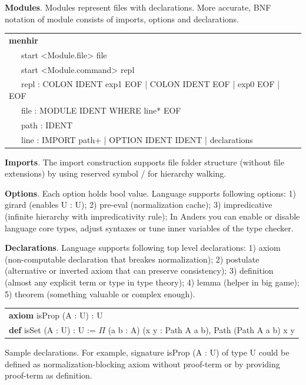 \documentclass[a4paper,UKenglish,cleveref, autoref, thm-restate]{lipics-v2021}
\newcommand{\tabstyle}[0]{\scriptsize\ttfamily\fontseries{l}\selectfont}
\begin{document}
\textbf{Modules}. Modules represent files with declarations. More accurate, BNF notation of module consists of imports, options and declarations.
\begin{table}[ht!]
\tabstyle
\begin{tabular}{l}
\textbf{menhir} \\
\ \ \ start <Module.file> file \\
\ \ \ start <Module.command> repl \\
\ \ \ repl : COLON IDENT exp1 EOF | COLON IDENT EOF | exp0 EOF | EOF \\
\ \ \ file : MODULE IDENT WHERE line* EOF \\
\ \ \ path : IDENT \\
\ \ \ line : IMPORT path+ | OPTION IDENT IDENT | declarations \\
\end{tabular}
\end{table}

\textbf{Imports}. The import construction supports file folder structure (without file extensions)
by using reserved symbol / for hierarchy walking.

\textbf{Options}. Each option holds bool value. Language supports following options:
1) girard (enables U : U);
2) pre-eval (normalization cache);
3) impredicative (infinite hierarchy with impredicativity rule);
In Anders you can enable or disable language core types, adjust syntaxes or
tune inner variables of the type checker.

\textbf{Declarations}. Language supports following top level declarations:
1) axiom (non-computable declaration that breakes normalization);
2) postulate (alternative or inverted axiom that can preserve consistency);
3) definition (almost any explicit term or type in type theory);
4) lemma (helper in big game);
5) theorem (something valuable or complex enough).

\begin{table}[ht!]
\tabstyle
\begin{tabular}{l}
\textbf{axiom} isProp (A : U) : U \\
\textbf{def} isSet (A : U) : U := \textbf{$\Pi$} (a b : A) (x y : Path A a b), Path (Path A a b) x y
\end{tabular}
\end{table}

Sample declarations. For example, signature isProp (A : U) of type U could be
defined as normalization-blocking axiom without proof-term or by providing proof-term as definition.
\end{document}
